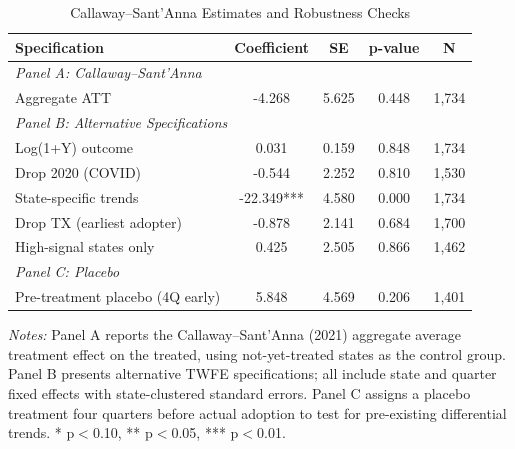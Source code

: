 \begin{table}[H]
\centering
\caption{Callaway--Sant'Anna Estimates and Robustness Checks}
\begin{threeparttable}
\begin{tabular}{lcccc}
\toprule
Specification & Coefficient & SE & p-value & N \\
\midrule
\multicolumn{5}{l}{\textit{Panel A: Callaway--Sant'Anna}} \\
Aggregate ATT & -4.268 & 5.625 & 0.448 & 1,734 \\[6pt]
\multicolumn{5}{l}{\textit{Panel B: Alternative Specifications}} \\
Log(1+Y) outcome & 0.031 & 0.159 & 0.848 & 1,734 \\
Drop 2020 (COVID) & -0.544 & 2.252 & 0.810 & 1,530 \\
State-specific trends & -22.349*** & 4.580 & 0.000 & 1,734 \\
Drop TX (earliest adopter) & -0.878 & 2.141 & 0.684 & 1,700 \\
High-signal states only & 0.425 & 2.505 & 0.866 & 1,462 \\
\midrule
\multicolumn{5}{l}{\textit{Panel C: Placebo}} \\
Pre-treatment placebo (4Q early) & 5.848 & 4.569 & 0.206 & 1,401 \\
\bottomrule
\end{tabular}
\begin{tablenotes}[flushleft]
\small
\item \textit{Notes:} Panel A reports the Callaway--Sant'Anna (2021) aggregate average treatment effect on the treated, using not-yet-treated states as the control group. Panel B presents alternative TWFE specifications; all include state and quarter fixed effects with state-clustered standard errors. Panel C assigns a placebo treatment four quarters before actual adoption to test for pre-existing differential trends. * p$<$0.10, ** p$<$0.05, *** p$<$0.01.
\end{tablenotes}
\end{threeparttable}
\label{tab:robust}
\end{table}
